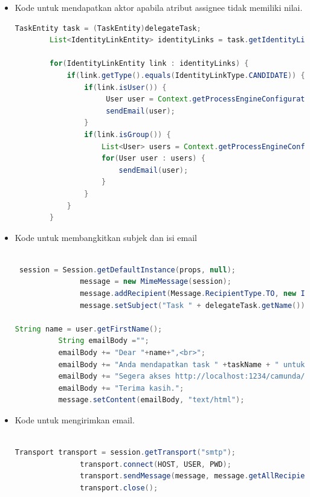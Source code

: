 \begin{itemize}
		\item Kode untuk mendapatkan aktor apabila atribut assignee tidak memiliki nilai.
	\begin{lstlisting}[language=Java,basicstyle=\tiny,caption =TaskAssignmentListener.java]
	    	TaskEntity task = (TaskEntity)delegateTask;
    	List<IdentityLinkEntity> identityLinks = task.getIdentityLinks();
    	
    	for(IdentityLinkEntity link : identityLinks) {
    		if(link.getType().equals(IdentityLinkType.CANDIDATE)) {
    		    if(link.isUser()) {
	    		     User user = Context.getProcessEngineConfiguration().getIdentityService().createUserQuery().userId(link.getUserId()).singleResult();
	    		     sendEmail(user);
    		    }
    		    if(link.isGroup()) {
    		        List<User> users = Context.getProcessEngineConfiguration().getIdentityService().createUserQuery().memberOfGroup(link.getGroupId()).list();
    		        for(User user : users) {
    		        	sendEmail(user);
    		        }
    		    }
    		}
    	}
	\end{lstlisting}
	
	

	\item Kode untuk membangkitkan subjek dan isi email
	\begin{lstlisting}[language=Java,basicstyle=\tiny,caption=TaskAssignmentListener.java]

 session = Session.getDefaultInstance(props, null);
               message = new MimeMessage(session);
               message.addRecipient(Message.RecipientType.TO, new InternetAddress(recipient));
               message.setSubject("Task " + delegateTask.getName());
               
String name = user.getFirstName();
          String emailBody ="";
          emailBody += "Dear "+name+",<br>";
          emailBody += "Anda mendapatkan task " +taskName + " untuk dikerjakan.<br>";
          emailBody += "Segera akses http://localhost:1234/camunda/app/tasklist/default/#/?task="+taskId +" untuk menjalankannya.<br>";
          emailBody += "Terima kasih.";
          message.setContent(emailBody, "text/html");

\end{lstlisting}

	\item Kode untuk mengirimkan email.
	\begin{lstlisting}[language=Java,basicstyle=\tiny,caption=TaskAssignmentListener.java]

Transport transport = session.getTransport("smtp");            
               transport.connect(HOST, USER, PWD);
               transport.sendMessage(message, message.getAllRecipients());
               transport.close();
\end{lstlisting}
	
\end{itemize}
